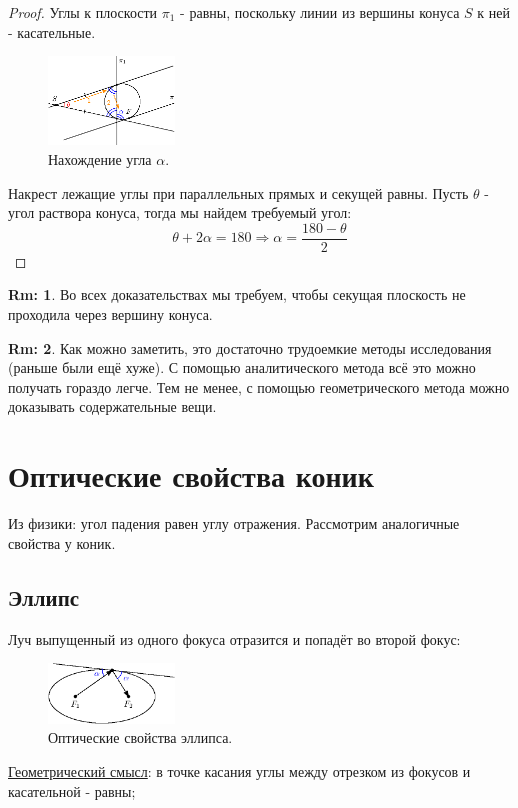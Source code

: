 \documentclass[12pt]{article}
\theoremstyle{definition}
\newtheorem{rem}{Rm:}
\begin{document}
\begin{proof}
	Углы к плоскости $\pi_1$ - равны, поскольку линии из вершины конуса $S$ к ней - касательные.
	\begin{figure}[H]
		\centering
		\includegraphics[width=0.3\textwidth]{ANGL1_16.eps}
		\caption{Нахождение угла $\alpha$.}
		\label{1_16}
	\end{figure}
	Накрест лежащие углы при параллельных прямых и секущей равны. Пусть $\theta$ - угол раствора конуса, тогда мы найдем требуемый угол:
	$$
		\theta + 2\alpha = 180 \Rightarrow \alpha = \dfrac{180 - \theta}{2}
	$$
\end{proof}
\begin{rem}
	Во всех доказательствах мы требуем, чтобы секущая плоскость не проходила через вершину конуса.
\end{rem}

\begin{rem}
	Как можно заметить, это достаточно трудоемкие методы исследования (раньше были ещё хуже). С помощью аналитического метода всё это можно получать гораздо легче. Тем не менее, с помощью геометрического метода можно доказывать содержательные вещи.
\end{rem}

\section*{Оптические свойства коник}

Из физики: угол падения равен углу отражения. Рассмотрим аналогичные свойства у коник.
\subsection*{Эллипс}
Луч выпущенный из одного фокуса отразится и попадёт во второй фокус:
	\begin{figure}[H]
		\centering
		\includegraphics[width=0.3\textwidth]{ANGL1_17.eps}
		\caption{Оптические свойства эллипса.}
		\label{1_17}
	\end{figure}
\uline{Геометрический смысл}: в точке касания углы между отрезком из фокусов и касательной - равны;
\end{document}
